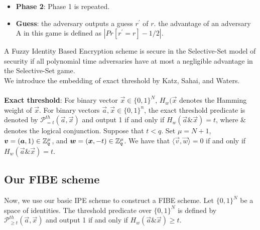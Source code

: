 \documentclass{llncs}
\begin{document}
\begin{appendix}
\begin{itemize}
 \item \textbf{Phase 2}: Phase 1 is repeated.
 \item \textbf{Guess}: the adversary outputs a guess $r^{'}$ of $r$. the advantage of an adversary A in this game is defined as $|Pr[r^{'}=r]-1/2|$.
\end{itemize}
A Fuzzy Identity Based Encryption scheme is secure in the Selective-Set model of security if all polynomial time adversaries have at most a negligible advantage in the Selective-Set game.\\[0.2cm]
We introduce the embedding of exact threshold by Katz, Sahai, and Waters\cite{EC:KatSahWat08}.\\
\\
\textbf{Exact threshold}: For binary vector $\vec{x} \in \{0,1\}^{N}$, $H_{w}(\vec{x}$ denotes the Hamming weight of $\vec{x}$. For binary vectors $\vec{a}, \vec{x} \in \{0,1\}^{n}$, the exact threshold predicate is denoted by $\mathcal{P}^{th}_{=t}(\vec{a}, \vec{x})$ and output 1 if and only if $H_{w}(\vec{a} \& \vec{x})=t$, where $\&$ denotes the logical conjunction. Suppose that $t<q$. Set $\mu=N+1$, $\boldsymbol{v}=(\boldsymbol{a}, 1) \in \mathbb{Z}^{\mu}_{q}$, and $\boldsymbol{w}=(\boldsymbol{x}, -t) \in \mathbb{Z}^{\mu}_{q}$. We have that $\langle \vec{v}, \vec{w} \rangle =0 $ if and only if $H_{w}(\vec{a} \& \vec{x})=t$.

\subsection{Our FIBE scheme}
Now, we use our basic IPE scheme to construct a FIBE scheme. Let $\{0,1\}^{N}$ be a space of identities. The threshold predicate over $\{0,1\}^{N}$ is defined by $\mathcal{P}^{th}_{\geq t}(\vec{a}, \vec{x})$ and output 1 if and only if $H_{w}(\vec{a} \& \vec{x}) \geq t$.\


\end{appendix}
\end{document}
